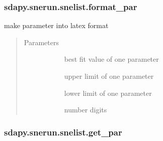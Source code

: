 \documentclass[letterpaper,10pt,english]{sphinxmanual}
\begin{document}
\begin{fulllineitems}
\subsubsection{sdapy.snerun.snelist.format\_par}
\label{\detokenize{generated/sdapy.snerun.snelist.format_par:sdapy-snerun-snelist-format-par}}\label{\detokenize{generated/sdapy.snerun.snelist.format_par::doc}}

\begin{fulllineitems}
\label{\detokenize{generated/sdapy.snerun.snelist.format_par:sdapy.snerun.snelist.format_par}}
make parameter into latex format
\begin{quote}\begin{description}
\item[{Parameters}] \leavevmode\begin{description}
\item[{}] \leavevmode{[}\sphinxtitleref{float}{]}
best fit value of one parameter

\item[{}] \leavevmode{[}\sphinxtitleref{float}{]}
upper limit of one parameter

\item[{}] \leavevmode{[}\sphinxtitleref{float}{]}
lower limit of one parameter

\item[{}] \leavevmode{[}\sphinxtitleref{int}{]}
number digits

\end{description}

\end{description}\end{quote}

\end{fulllineitems}



\subsubsection{sdapy.snerun.snelist.get\_par}
\label{\detokenize{generated/sdapy.snerun.snelist.get_par:sdapy-snerun-snelist-get-par}}\label{\detokenize{generated/sdapy.snerun.snelist.get_par::doc}}


\end{fulllineitems}
\end{document}
